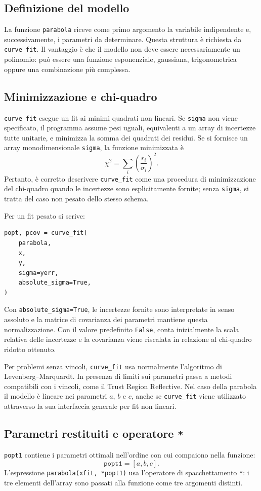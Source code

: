 \documentclass[11pt,a4paper]{book}
\begin{document}
\subsection{Definizione del modello}
La funzione \texttt{parabola} riceve come primo argomento la variabile indipendente e, successivamente, i parametri da determinare. Questa struttura è richiesta da \texttt{curve\_fit}. Il vantaggio è che il modello non deve essere necessariamente un polinomio: può essere una funzione esponenziale, gaussiana, trigonometrica oppure una combinazione più complessa.

\subsection{Minimizzazione e chi-quadro}
\texttt{curve\_fit} esegue un fit ai minimi quadrati non lineari. Se \texttt{sigma} non viene specificato, il programma assume pesi uguali, equivalenti a un array di incertezze tutte unitarie, e minimizza la somma dei quadrati dei residui. Se si fornisce un array monodimensionale \texttt{sigma}, la funzione minimizzata è
\[
 \chi^2=\sum_i\left(\frac{r_i}{\sigma_i}\right)^2.
\]
Pertanto, è corretto descrivere \texttt{curve\_fit} come una procedura di minimizzazione del chi-quadro quando le incertezze sono esplicitamente fornite; senza \texttt{sigma}, si tratta del caso non pesato dello stesso schema.

Per un fit pesato si scrive:
\begin{lstlisting}
popt, pcov = curve_fit(
    parabola,
    x,
    y,
    sigma=yerr,
    absolute_sigma=True,
)
\end{lstlisting}
Con \texttt{absolute\_sigma=True}, le incertezze fornite sono interpretate in senso assoluto e la matrice di covarianza dei parametri mantiene questa normalizzazione. Con il valore predefinito \texttt{False}, conta inizialmente la scala relativa delle incertezze e la covarianza viene riscalata in relazione al chi-quadro ridotto ottenuto.

Per problemi senza vincoli, \texttt{curve\_fit} usa normalmente l'algoritmo di Levenberg--Marquardt. In presenza di limiti sui parametri passa a metodi compatibili con i vincoli, come il Trust Region Reflective. Nel caso della parabola il modello è lineare nei parametri $a$, $b$ e $c$, anche se \texttt{curve\_fit} viene utilizzato attraverso la sua interfaccia generale per fit non lineari.

\subsection{Parametri restituiti e operatore \texttt{*}}
\texttt{popt1} contiene i parametri ottimali nell'ordine con cui compaiono nella funzione:
\[
 \texttt{popt1}=[a,b,c].
\]
L'espressione \texttt{parabola(xfit, *popt1)} usa l'operatore di spacchettamento \texttt{*}: i tre elementi dell'array sono passati alla funzione come tre argomenti distinti.
\end{document}
